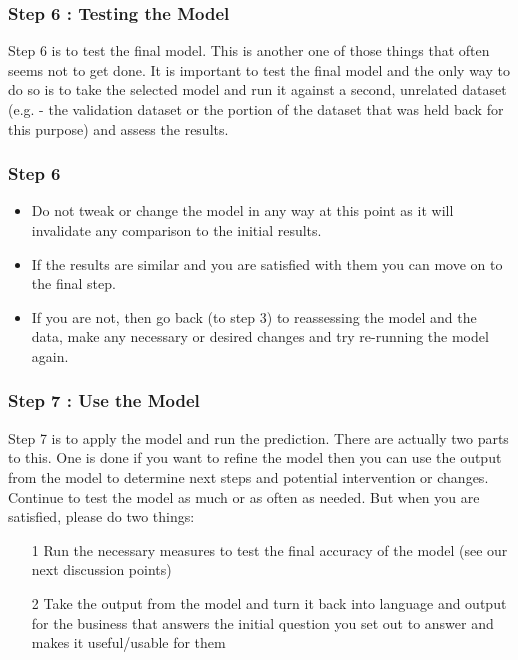 \documentclass[PredictiveAnalytics101.tex]{subfiles}
\begin{document}
\begin{frame}
\frametitle{Step 6 : Testing the Model}
Step 6 is to test the final model. This is another one of those things that often seems not to get done.
It is important to test the final model and the only way to do so is to take the selected model and run it
against a second, unrelated dataset (e.g. - the validation dataset or the portion of the dataset that was
held back for this purpose) and assess the results.
\end{frame}
\begin{frame}
	\frametitle{Step 6}
	\Large
\begin{itemize}
\item Do not tweak or change the model in any way at this
point as it will invalidate any comparison to the initial results. 
\item If the results are similar and you are
satisfied with them you can move on to the final step. 
\item If you are not, then go back (to step 3) to
reassessing the model and the data, make any necessary or desired changes and try re-running the
model again.
\end{itemize}

\end{frame}
\begin{frame}
\frametitle{Step 7 : Use the Model}
Step 7 is to apply the model and run the prediction. There are actually two parts to this. One is done if
you want to refine the model then you can use the output from the model to determine next steps and
potential intervention or changes. Continue to test the model as much or as often as needed. But when
you are satisfied, please do two things:
\begin{itemize}
\item[1] Run the necessary measures to test the final accuracy of the model (see our next discussion
points)
\item[2] Take the output from the model and turn it back into language and output for the business
that answers the initial question you set out to answer and makes it useful/usable for them 
\end{itemize}
\end{frame}
\end{document}
